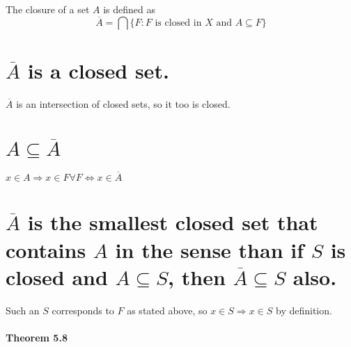 The closure of a set $A$ is defined as
$$\overline{A} = \bigcap \{F:F \text{ is closed in } X \text{ and } A \subseteq F\}$$


\begin{parts}
 \part{$\overline{A}$ is a closed set.}
 
 
\begin{solution}
 $\overline{A}$ is an intersection of closed sets, so it too is closed.
\end{solution}

\part{$A \subseteq \overline{A}$}

\begin{solution}
 $x \in A \Rightarrow x \in F \forall F \iff x \in \overline{A}$
\end{solution}

\part{$\overline{A}$ is the smallest closed set that contains $A$ in the sense than if $S$ is closed and $A \subseteq S$, then $\overline{A} \subseteq S$ also.}

\begin{solution}
 Such an $S$ corresponds to $F$ as stated above, so $x \in S \Rightarrow x \in S$ by definition.
\end{solution}
\end{parts}

\subsection{Theorem 5.8} \label{thm4.5.8}
\setcounter{question}{0}



